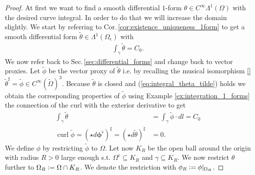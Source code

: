 \documentclass[12pt,a4paper]{article}
\numberwithin{equation}{subsection}
\numberwithin{lemma}{subsection}
\theoremstyle{definition}
\DeclareMathOperator{\curl}{curl}
\begin{document}
\begin{proof}
    At first we want to find a smooth differential $1$-form 
    $\theta \in C^\infty\Lambda^1(\Omega)$ with the desired curve integral. 
    In order to do that we will increase the 
    domain slightly.
    We start by referring to Cor.\,\ref{cor:existence_uniqueness_1form} 
    to get a smooth differential form 
    $\tilde{\theta} \in \Lambda^1(\Omega_\epsilon)$ with 
    \begin{align}
        \int_\gamma \tilde{\theta} = C_0. \label{eq:integral_theta_tilde}
    \end{align}
    We now refer back to Sec.\,\ref{sec:differential_forms} 
    and change back to vector proxies. Let 
    $\tilde{\phi}$ be the vector proxy of $\tilde{\theta}$ 
    i.e. by recalling the musical isomorphism \ref{}
     $\tilde{\theta}^\sharp = \tilde{\phi} \in C^\infty(\tilde{\Omega})^3$.
    Because $\tilde{\theta}$ is closed and (\ref{eq:integral_theta_tilde}) holds
    we obtain the corresponding properties 
    of $\tilde{\phi}$ using Example \ref{ex:integration_1_forms} the connection 
    of the curl with the exterior derivative to get 
    \begin{align*}
        \int_\gamma \tilde{\theta} &= \int_\gamma \tilde{\phi} \cdot dl = C_0 
        \\ \curl \tilde{\phi} = (\star d\boldsymbol{\phi}^\flat)^\sharp = 
        (\star d\tilde{\theta})^\sharp &= 0.
    \end{align*}
    We define $\phi$ by restricting $\tilde{\phi}$ to $\Omega$. 
    Let now $K_R$ be the open ball around the origin with radius $R>0$ large
    enough s.t. $\Omega^c \subseteq K_R$ and $\gamma \subseteq K_R$. 
    We now restrict $\theta$ further to
    $\Omega_R \vcentcolon= \Omega \cap K_R$. We denote the restriction with 
    $\phi_R \vcentcolon= \phi|_{\Omega_R}$. 


\end{proof}
\end{document}
